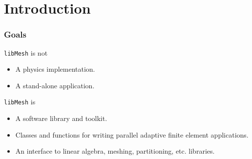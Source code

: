 \section{Introduction}

\begin{frame}[<+->]
  \frametitle{Goals}   
  \begin{block}{\texttt{libMesh} is not}
  \begin{itemize}
  \item {A physics implementation.}
  \item {A stand-alone application.}
  \end{itemize}
  \end{block}
  \begin{block}{\texttt{libMesh} is}
  \begin{itemize}
  \item {A software library and toolkit.}
  \item {Classes and functions for writing parallel adaptive finite
element applications.}
  \item {An interface to linear algebra, meshing, partitioning, etc.
libraries.}
  \end{itemize}
  \end{block}
\end{frame}


